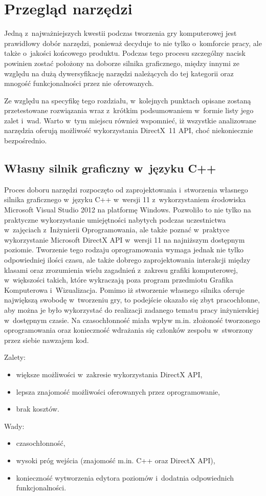 
\chapter{Przegląd narzędzi}
Jedną z~najważniejszych kwestii podczas tworzenia gry komputerowej jest prawidłowy dobór narzędzi, ponieważ decyduje to nie tylko o~komforcie pracy, ale także o~jakości końcowego produktu. Podczas tego procesu szczególny nacisk powinien zostać położony na doborze silnika graficznego, między innymi ze względu na dużą dywersyfikację narzędzi należących do tej kategorii oraz mnogość funkcjonalności przez nie oferowanych.

Ze względu na specyfikę tego rozdziału, w~kolejnych punktach opisane zostaną przetestowane rozwiązania wraz z~krótkim podsumowaniem w~formie listy jego zalet i~wad. Warto w~tym miejscu również wspomnieć, iż wszystkie analizowane narzędzia oferują możliwość wykorzystania DirectX~11 API, choć niekoniecznie bezpośrednio.

\section{Własny silnik graficzny w~języku C++}
Proces doboru narzędzi rozpoczęto od zaprojektowania i~stworzenia własnego silnika graficznego w~języku C++ w~wersji 11 z~wykorzystaniem środowiska Microsoft Visual Studio 2012 na platformę Windows. Pozwoliło to nie tylko na praktyczne wykorzystanie umiejętności nabytych podczas uczestnictwa w~zajęciach z~Inżynierii Oprogramowania, ale także poznać w~praktyce wykorzystanie Microsoft DirectX API w~wersji 11 na najniższym dostępnym poziomie. Tworzenie tego rodzaju oprogramowania wymaga jednak nie tylko odpowiedniej ilości czasu, ale także dobrego zaprojektowania interakcji między klasami oraz zrozumienia wielu zagadnień z~zakresu grafiki komputerowej, w~większości takich, które wykraczają poza program przedmiotu Grafika Komputerowa i~Wizualizacja.
Pomimo iż stworzenie własnego silnika oferuje największą swobodę w~tworzeniu gry, to podejście okazało się zbyt pracochłonne, aby można je było wykorzystać do realizacji zadanego tematu pracy inżynierskiej w~dostępnym czasie. Na czasochłonność miała wpływ m.in. złożoność tworzonego oprogramowania oraz konieczność wdrażania się członków zespołu w~stworzony przez siebie nawzajem kod.\\

{\raggedright Zalety:
\begin{itemize}
\item większe możliwości w~zakresie wykorzystania DirectX API,
\item lepsza znajomość możliwości oferowanych przez oprogramowanie,
\item brak kosztów.
\end{itemize}

Wady:
\begin{itemize}
\item czasochłonność,
\item wysoki próg wejścia (znajomość m.in. C++ oraz DirectX API),
\item konieczność wytworzenia edytora poziomów i~dodatnia odpowiednich funkcjonalności.
\end{itemize}
}

